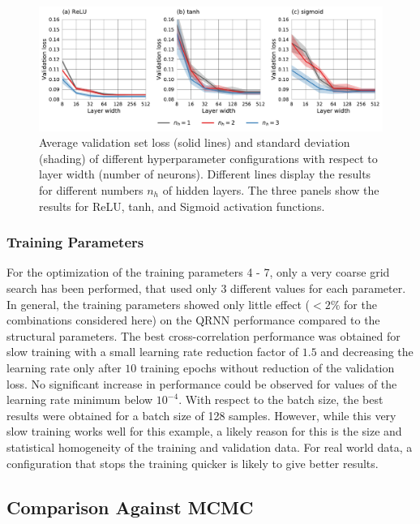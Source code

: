 \documentclass[journal abbreviation, manuscript]{copernicus}
\begin{document}
  \begin{figure}[hbpt!]
    \centering
    \includegraphics[width = 1.0\linewidth]{../plots/hyperparams}
    \caption{Average validation set loss (solid lines) and standard deviation (shading)
             of different hyperparameter configurations with respect to layer width (number of neurons).
             Different lines display the results for different numbers $n_h$ of hidden layers.
             The three panels show the results for ReLU, tanh, and Sigmoid activation functions.}
    \label{fig:hyperparams}
  \end{figure}

 \subsubsection{Training Parameters}
 
For the optimization of the training parameters 4 - 7, only a very coarse grid
search has been performed, that used only 3 different values for each parameter.
In general, the training parameters showed only little effect ($< 2\%$ for the
combinations considered here) on the QRNN performance compared to the structural
parameters. The best cross-correlation performance was obtained for slow
training with a small learning rate reduction factor of $1.5$ and decreasing the
learning rate only after $10$ training epochs without reduction of the
validation loss. No significant increase in performance could be observed for
values of the learning rate minimum below $10^{-4}$. With respect to the batch
size, the best results were obtained for a batch size of 128 samples. However,
while this very slow training works well for this example, a likely reason for
this is the size and statistical homogeneity of the training and validation
data. For real world data, a configuration that stops the training quicker is
likely to give better results.

\subsection{Comparison Against MCMC}
  
\end{document}
